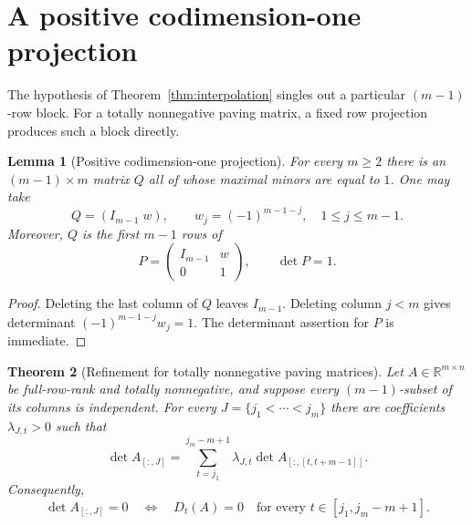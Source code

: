 \documentclass{amsart}
\numberwithin{equation}{section}
\newtheorem{theorem}{Theorem}
\newtheorem{lemma}[theorem]{Lemma}
\theoremstyle{definition}
\theoremstyle{remark}
\newcommand{\RR}{\mathbb R}
\begin{document}
\section{A positive codimension-one projection}\label{sec:projection}

The hypothesis of Theorem~\ref{thm:interpolation} singles out a particular $(m-1)$-row block.  For a totally nonnegative paving matrix, a fixed row projection produces such a block directly.

\begin{lemma}[Positive codimension-one projection]\label{lem:positive-projection}
For every $m\ge2$ there is an $(m-1)\times m$ matrix $Q$ all of whose maximal minors are equal to $1$.  One may take
\begin{equation}\label{eq:Q}
 Q=(I_{m-1}\;w),
 \qquad
 w_j=(-1)^{m-1-j},\quad 1\le j\le m-1.
\end{equation}
Moreover, $Q$ is the first $m-1$ rows of
\begin{equation}\label{eq:P}
 P=\begin{pmatrix}I_{m-1}&w\\0&1\end{pmatrix},
 \qquad \det P=1.
\end{equation}
\end{lemma}

\begin{proof}
Deleting the last column of $Q$ leaves $I_{m-1}$.  Deleting column $j<m$ gives determinant $(-1)^{m-1-j}w_j=1$.  The determinant assertion for $P$ is immediate.
\end{proof}

\begin{theorem}[Refinement for totally nonnegative paving matrices]\label{thm:paving-refinement}
Let $A\in\RR^{m\times n}$ be full-row-rank and totally nonnegative, and suppose every $(m-1)$-subset of its columns is independent.  For every $J=\{j_1<\cdots<j_m\}$ there are coefficients $\lambda_{J,t}>0$ such that
\begin{equation}\label{eq:paving-refinement}
 \det A_{[:,J]}
 =\sum_{t=j_1}^{j_m-m+1}\lambda_{J,t}
   \det A_{[:,[t,t+m-1]]}.
\end{equation}
Consequently,
\begin{equation}\label{eq:paving-zero-criterion}
 \det A_{[:,J]}=0
 \quad\Longleftrightarrow\quad
 D_t(A)=0\quad\text{for every }t\in[j_1,j_m-m+1].
\end{equation}
\end{theorem}
\end{document}
